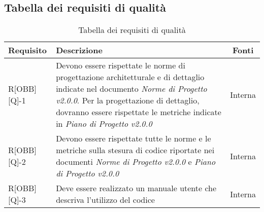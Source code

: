\subsection{Tabella dei requisiti di qualità}

\begin{center}
	\begin{table}[h]
	\begin{tabular}{|l|p{}|c|}
		\toprule
		
		\textbf{Requisito} & \textbf{Descrizione} & \textbf{Fonti} \\
		
		\midrule
		R[OBB][Q]-1 & Devono essere rispettate le norme di progettazione architetturale e di dettaglio indicate nel documento \textit{Norme di Progetto v2.0.0}. Per la progettazione di dettaglio, dovranno essere rispettate le metriche indicate in \textit{Piano di Progetto v2.0.0} & Interna \\ \midrule
		R[OBB][Q]-2 & Devono essere rispettate tutte le norme e le metriche sulla stesura di codice riportate nei documenti \textit{Norme di Progetto v2.0.0} e \textit{Piano di Progetto v2.0.0} & Interna \\ \midrule
		R[OBB][Q]-3 & Deve essere realizzato un manuale utente che descriva l'utilizzo del codice & Interna \\
		
		\bottomrule

	\end{tabular}
	\caption{Tabella dei requisiti di qualità}
	
	\end{table}
\end{center}
\newpage

